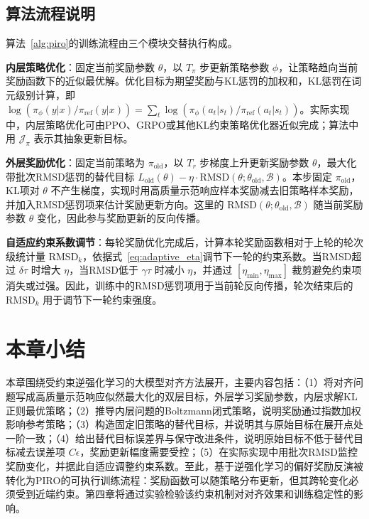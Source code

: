 \subsection{算法流程说明}

算法~\ref{alg:piro}的训练流程由三个模块交替执行构成。

\textbf{内层策略优化}：固定当前奖励参数 $\theta$，以 $T_\pi$ 步更新策略参数 $\phi$，让策略趋向当前奖励函数下的近似最优解。优化目标为期望奖励与KL惩罚的加权和，KL惩罚在词元级别计算，即 $\log(\pi_\phi(y|x)/\pi_{\mathrm{ref}}(y|x)) = \sum_t \log(\pi_\phi(a_t|s_t)/\pi_{\mathrm{ref}}(a_t|s_t))$。实际实现中，内层策略优化可由PPO、GRPO或其他KL约束策略优化器近似完成；算法中用 $\mathcal{J}_\pi$ 表示其抽象更新目标。

\textbf{外层奖励优化}：固定当前策略为 $\pi_{\mathrm{old}}$，以 $T_r$ 步梯度上升更新奖励参数 $\theta$，最大化带批次RMSD惩罚的替代目标 $L_{\mathrm{old}}(\theta)-\eta\cdot\mathrm{RMSD}(\theta;\theta_{\mathrm{old}},\mathcal{B})$。本步固定 $\pi_{\mathrm{old}}$，KL项对 $\theta$ 不产生梯度，实现时用高质量示范响应样本奖励减去旧策略样本奖励，并加入RMSD惩罚项来估计奖励更新方向。这里的 $\mathrm{RMSD}(\theta;\theta_{\mathrm{old}},\mathcal{B})$ 随当前奖励参数 $\theta$ 变化，因此参与奖励更新的反向传播。

\textbf{自适应约束系数调节}：每轮奖励优化完成后，计算本轮奖励函数相对于上轮的轮次级统计量 $\mathrm{RMSD}_k$，依据式~\eqref{eq:adaptive_eta}调节下一轮的约束系数。当RMSD超过 $\delta\tau$ 时增大 $\eta$，当RMSD低于 $\gamma\tau$ 时减小 $\eta$，并通过 $[\eta_{\min},\eta_{\max}]$ 裁剪避免约束项消失或过强。因此，训练中的RMSD惩罚项用于当前轮反向传播，轮次结束后的 $\mathrm{RMSD}_k$ 用于调节下一轮约束强度。

\section{本章小结}

本章围绕受约束逆强化学习的大模型对齐方法展开，主要内容包括：（1）将对齐问题写成高质量示范响应似然最大化的双层目标，外层学习奖励参数，内层求解KL正则最优策略；（2）推导内层问题的Boltzmann闭式策略，说明奖励通过指数加权影响参考策略；（3）构造固定旧策略的替代目标，并说明其与原始目标在展开点处一阶一致；（4）给出替代目标误差界与保守改进条件，说明原始目标不低于替代目标减去误差项 $C\epsilon$，奖励更新幅度需要受控；（5）在实际实现中用批次RMSD监控奖励变化，并据此自适应调整约束系数。至此，基于逆强化学习的偏好奖励反演被转化为PIRO的可执行训练流程：奖励函数可以随策略分布更新，但其跨轮变化必须受到近端约束。第四章将通过实验检验该约束机制对对齐效果和训练稳定性的影响。
